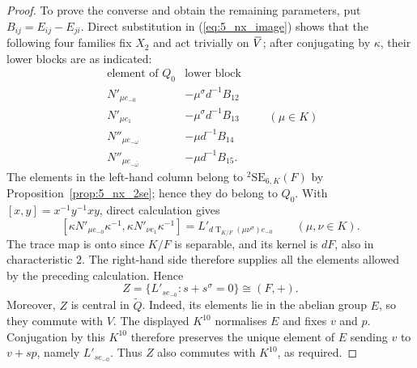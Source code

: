 \documentclass{amsart}
\def\ovV{\mathord{\mbox{\hspace*{0pt}}\,\overline{\!V\!\!\;}\!\:}\mbox{\hspace*{0pt}}}
\newcommand{\SE}{\mathrm{SE}}
\newcommand{\Tr}{\operatorname{T}}
\renewcommand{\bar}{\overline}
\newcommand{\s}{\sigma}
\theoremstyle{plain}
\numberwithin{theorem}{section}
\theoremstyle{definition}
\begin{document}
\begin{proof}
	To prove the converse and obtain the remaining parameters, put
	$B_{ij}=E_{ij}-E_{ji}$.  Direct substitution in
	(\ref{eq:5_nx_image}) shows that the following four families fix $X_2$ and act
	trivially on $\ovV$; after conjugating by $\kappa$, their lower blocks are as
	indicated:
	\begin{equation}
		\label{eq:7_type2_kernel_seeds}
	\begin{array}{c|c}
	\text{element of $Q_0$}&\text{lower block}\\ \hline
	N'_{\mu e_{-0}}&-\mu^{\s}d^{-1}B_{12}\\
	N'_{\mu e_1}&-\mu^{\s}d^{-1}B_{13}\\
	N''_{\mu e_{-\omega}}&-\mu d^{-1}B_{14}\\
	N''_{\mu e_{-\bar\omega}}&-\mu d^{-1}B_{15}.
	\end{array}
	\qquad(\mu\in K)
	\end{equation}
	The elements in the left-hand column belong to ${}^2\SE_{6,K}(F)$ by
	Proposition~\ref{prop:5_nx_2se}; hence they do belong to $Q_0$.
	With $[x,y]=x^{-1}y^{-1}xy$, direct calculation gives
	\begin{equation}
		\label{eq:7_type2_kernel_commutator}
		[\kappa N'_{\mu e_{-0}}\kappa^{-1},
		\kappa N'_{\nu e_1}\kappa^{-1}]
		=L'_{d\Tr_{K/F}(\mu\nu^{\s})e_{-0}}
		\qquad(\mu,\nu\in K).
	\end{equation}
	The trace map is onto since $K/F$ is separable, and its kernel is $dF$,
	also in characteristic $2$.  The right-hand side therefore supplies all
	the elements allowed by the preceding calculation.  Hence
	\begin{equation}
		\label{eq:7_type2_V0}
		Z=\{L'_{s e_{-0}}:s+s^{\s}=0\}\cong(F,+).
	\end{equation}
	Moreover, $Z$ is central in $\widetilde Q$.  Indeed, its elements lie in
	the abelian group $E$, so they commute with $V$.  The displayed $K^{10}$
	normalises $E$ and fixes $v$ and $p$.  Conjugation by this $K^{10}$ therefore
	preserves the unique element of $E$ sending $v$ to $v+sp$, namely
	$L'_{s e_{-0}}$.  Thus $Z$ also commutes with $K^{10}$, as required.


\end{proof}
\end{document}

